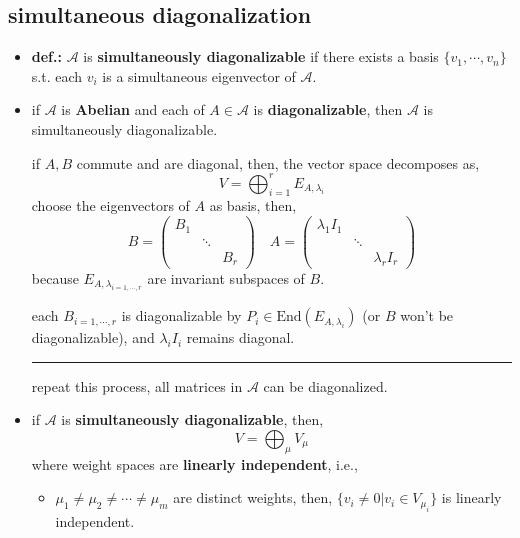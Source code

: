 \subsection{simultaneous diagonalization} \label{A.3.2}
\begin{itemize}
	\item \textbf{def.:} $\mathcal{A}$ is \textbf{simultaneously diagonalizable} if there exists a basis $\{v_1, \cdots, v_n\}$ s.t. each $v_i$ is a simultaneous eigenvector of $\mathcal{A}$.
	
	\item if $\mathcal{A}$ is \textbf{Abelian} and each of $A \in \mathcal{A}$ is \textbf{diagonalizable}, then $\mathcal{A}$ is simultaneously diagonalizable.
	
	\begin{tcolorbox}[title=proof:]
		if $A, B$ commute and are diagonal, then, the vector space decomposes as,
		\begin{equation}
			V = \bigoplus_{i = 1}^r E_{A, \lambda_i}
		\end{equation}
		choose the eigenvectors of $A$ as basis, then,
		\begin{equation}
			B = \begin{pmatrix}
				B_1 & & \\
				& \ddots & \\
				& & B_r
			\end{pmatrix} \quad A = \begin{pmatrix}
				\lambda_1 I_1 & & \\
				& \ddots & \\
				& & \lambda_r I_r
			\end{pmatrix}
		\end{equation}
		because $E_{A, \lambda_{i = 1, \cdots, r}}$ are invariant subspaces of $B$.
		
		each $B_{i = 1, \cdots, r}$ is diagonalizable by $P_i \in \mathrm{End}(E_{A, \lambda_i})$ (or $B$ won't be diagonalizable), and $\lambda_i I_i$ remains diagonal.
		
		\noindent\rule[0.5ex]{\linewidth}{0.5pt} %
		
		repeat this process, all matrices in $\mathcal{A}$ can be diagonalized.
	\end{tcolorbox}
	
	\item if $\mathcal{A}$ is \textbf{simultaneously diagonalizable}, then,
	\begin{equation} \label{A.3.9}
		V = \bigoplus_\mu V_\mu
	\end{equation}
	where weight spaces are \textbf{linearly independent}, i.e.,
	\begin{itemize}
		\item $\mu_1 \neq \mu_2 \neq \cdots \neq \mu_m$ are distinct weights, then, $\{v_i \neq 0 | v_i \in V_{\mu_i}\}$ is linearly independent.
	\end{itemize}
	

\end{itemize}
